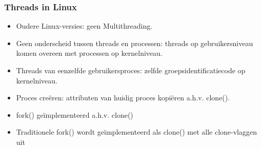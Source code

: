 \subsubsection{Threads in Linux}

\begin{itemize}
\item Oudere Linux-versies: geen Multithreading.
\item Geen onderscheid tussen threads en processen: threads op gebruikersniveau komen overeen met processen op kernelniveau.
\item Threads van eenzelfde gebruikersproces: zelfde groepsidentificatiecode op kernelniveau.
\item Proces creëren: attributen van huidig proces kopiëren a.h.v. clone().
\item fork() geïmplementeerd a.h.v. clone()
\item Traditionele fork() wordt geïmplementeerd als clone() met alle clone-vlaggen uit
\end{itemize}